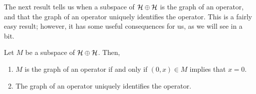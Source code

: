 The next result tells us when a subspace of $\mathcal{H} \oplus \mathcal{H}$ is the graph of an operator, and that the graph of an operator uniquely identifies the operator. This is a fairly easy result; however, it has some useful consequences for us, as we will see in a bit.

\begin{lemma}\label{lbl_lemma_subspace_conditions_to_be_graph}
  Let $M$ be a subspace of $\mathcal{H} \oplus \mathcal{H}$. Then,
  \begin{enumerate}[label=(\alph*)]
    \item $M$ is the graph of an operator if and only if $(0, x) \in M$ implies that $x = 0$.
    \item The graph of an operator uniquely identifies the operator.
  \end{enumerate}
\end{lemma}

